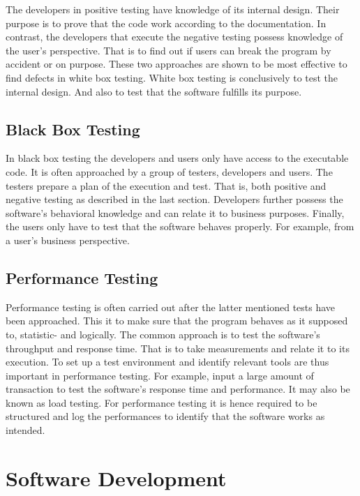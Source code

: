 \documentclass[a4paper,11pt]{kth-mag}
\begin{document}
The developers in positive testing have knowledge of its internal design.
Their purpose is to prove that the code work according to the documentation.
In contrast, the developers that execute the negative testing possess knowledge of the user's perspective.
That is to find out if users can break the program by accident or on purpose.
These two approaches are shown to be most effective to find defects in white box testing.
White box testing is conclusively to test the internal design.
And also to test that the software fulfills its purpose.

\subsection{Black Box Testing}
In black box testing the developers and users only have access to the executable code.
It is often approached by a group of testers, developers and users.
The testers prepare a plan of the execution and test.
That is, both positive and negative testing as described in the last section.
Developers further possess the software's behavioral knowledge and can relate it to business purposes.
Finally, the users only have to test that the software behaves properly.
For example, from a user's business perspective.

\subsection{Performance Testing}
Performance testing is often carried out after the latter mentioned tests have been approached.
This it to make sure that the program behaves as it supposed to, statistic- and logically.
The common approach is to test the software's throughput and response time.
That is to take measurements and relate it to its execution.
To set up a test environment and identify relevant tools are thus important in performance testing.
For example, input a large amount of transaction to test the software's response time and performance.
It may also be known as load testing.
For performance testing it is hence required to be structured and log the performances to identify that the software works as intended.

\clearpage

\section{Software Development}
\end{document}

